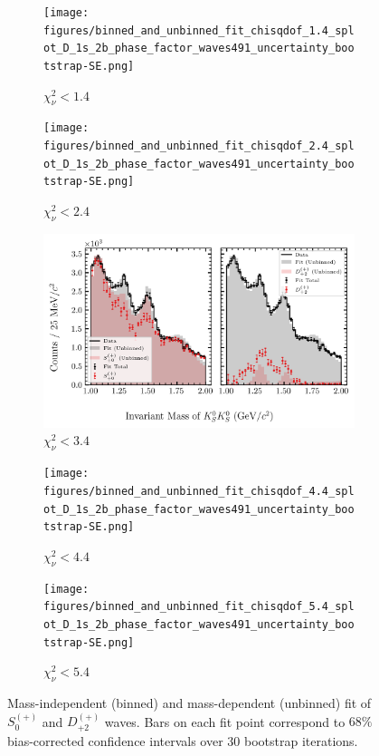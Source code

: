 \begin{figure}[htbp]
    \centering
    \begin{subfigure}{0.45\textwidth}
        \texttt{[image: figures/binned\_and\_unbinned\_fit\_chisqdof\_1.4\_splot\_D\_1s\_2b\_phase\_factor\_waves491\_uncertainty\_bootstrap-SE.png]}
        \caption{$\chi^2_\nu < 1.4$}
    \end{subfigure}
    \hfill
    \begin{subfigure}{0.45\textwidth}
        \texttt{[image: figures/binned\_and\_unbinned\_fit\_chisqdof\_2.4\_splot\_D\_1s\_2b\_phase\_factor\_waves491\_uncertainty\_bootstrap-SE.png]}
        \caption{$\chi^2_\nu < 2.4$}
    \end{subfigure}

    \vspace{1em}

    \begin{subfigure}{0.8\textwidth}
        \includegraphics[width=\linewidth]{figures/binned_and_unbinned_fit_chisqdof_3.4_splot_D_1s_2b_phase_factor_waves491_uncertainty_bootstrap-SE.png}
        \caption{$\chi^2_\nu < 3.4$}
    \end{subfigure}

    \vspace{1em}

    \begin{subfigure}{0.45\textwidth}
        \texttt{[image: figures/binned\_and\_unbinned\_fit\_chisqdof\_4.4\_splot\_D\_1s\_2b\_phase\_factor\_waves491\_uncertainty\_bootstrap-SE.png]}
        \caption{$\chi^2_\nu < 4.4$}
    \end{subfigure}
    \hfill
    \begin{subfigure}{0.45\textwidth}
        \texttt{[image: figures/binned\_and\_unbinned\_fit\_chisqdof\_5.4\_splot\_D\_1s\_2b\_phase\_factor\_waves491\_uncertainty\_bootstrap-SE.png]}
        \caption{$\chi^2_\nu < 5.4$}
    \end{subfigure}

    \caption{Mass-independent (binned) and mass-dependent (unbinned) fit of $S_{0}^{(+)}$ and $D_{+2}^{(+)}$ waves. Bars on each fit point correspond to $68\%$ bias-corrected confidence intervals over $ 30 $ bootstrap iterations.}
    \label{fig:unbinned-fit-all-Sp-D2p}
\end{figure}

